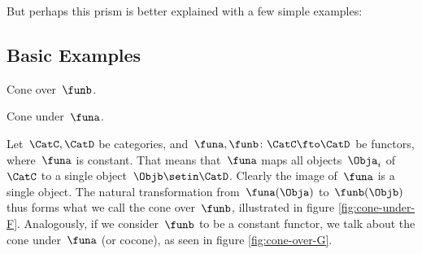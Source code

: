 \begin{figure*}[h]
    \centering
    \begin{ctdefinitionshade}
        \small
    \end{ctdefinitionshade}
    \caption{}
    \label{fig:nat_trans_graphically}
\end{figure*}

But perhaps this prism is better explained with a few simple examples:

\subsection{Basic Examples}

\begin{marginfigure}
    \centering
    \caption{Cone over~$\funb$.
    }
    \label{fig:cone-over-G}
\end{marginfigure}

\begin{marginfigure}
    \centering
    \label{fig:cone-under-F}
    \caption{Cone under~$\funa$.}
\end{marginfigure}

\begin{example}
    Let~$\CatC, \CatD$ be categories, and~$\funa, \funb\colon\CatC\fto\CatD$ be functors, where~$\funa$ is constant.
    That means that~$\funa$ maps all objects~$\Obja_i$ of~$\CatC$ to a single object~$\Objb \setin \CatD$.
    Clearly the image of~$\funa$ is a single object.
    The natural transformation from~$\funa(\Obja)$ to~$\funb(\Objb)$ thus forms what we call the cone over~$\funb$, illustrated in figure \cref{fig:cone-under-F}.
    Analogously, if we consider~$\funb$ to be a constant functor, we talk about the cone under~$\funa$ (or cocone), as seen in figure \cref{fig:cone-over-G}.
\end{example}

